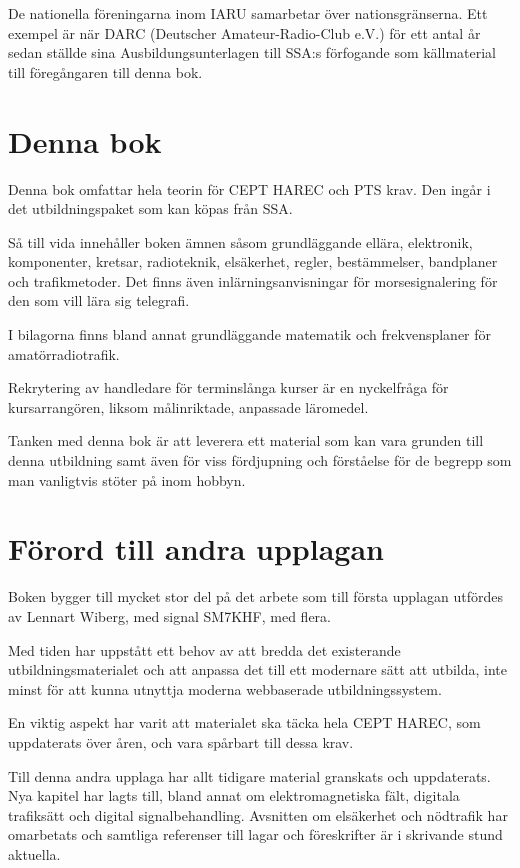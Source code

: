 De nationella föreningarna inom IARU samarbetar över nationsgränserna.
Ett exempel är när DARC (Deutscher Amateur-Radio-Club e.V.) för ett antal år
sedan ställde sina Ausbildungsunterlagen \cite{DARCaus} till SSA:s förfogande
som källmaterial till föregångaren till denna bok.

\section*{Denna bok}

Denna bok omfattar hela teorin för CEPT HAREC och PTS krav.
Den ingår i det utbildningspaket som kan köpas från SSA.

Så till vida innehåller boken ämnen såsom grundläggande ellära, elektronik, komponenter,
kretsar, radioteknik, elsäkerhet, regler, bestämmelser, bandplaner och tra\-fik\-metoder.
Det finns även inlärningsanvisningar för morsesignalering för den
som vill lära sig telegrafi.


I bilagorna finns bland annat grundläggande matematik
och frekvensplaner för amatörradiotrafik.

Rekrytering av handledare för terminslånga kurser är en nyckelfråga för
kursarrangören, liksom målinriktade, anpassade läromedel.

Tanken med denna bok är att leverera ett material som kan vara grunden till
denna utbildning samt även för viss fördjupning och förståelse för de begrepp
som man vanligtvis stöter på inom hobbyn.

\balance

\section*{Förord till andra upplagan}

Boken bygger till mycket stor del på det arbete som till första upplagan
utfördes av Lennart Wiberg, med signal SM7KHF, med flera.

Med tiden har uppstått ett behov av att bredda det existerande
utbildningsmaterialet och att anpassa det till ett modernare sätt att utbilda,
inte minst för att kunna utnyttja moderna webbaserade utbildningssystem.

En viktig aspekt har varit att materialet ska täcka hela CEPT HAREC,
som uppdaterats över åren, och vara spårbart till dessa krav.

Till denna andra upplaga har allt tidigare material granskats och uppdaterats.
Nya kapitel har lagts till, bland annat om elektromagnetiska fält, digitala
trafiksätt och digital signalbehandling.
Avsnitten om elsäkerhet och nödtrafik har omarbetats och samtliga referenser
till lagar och föreskrifter är i skrivande stund aktuella.

